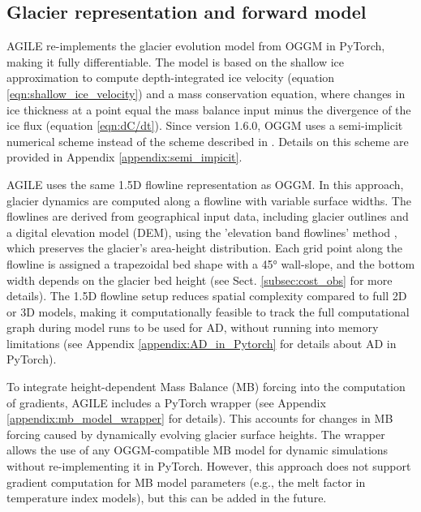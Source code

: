 \documentclass[journal abbreviation, manuscript]{copernicus}
\begin{document}
\subsection{Glacier representation and forward model}
\label{sec:Glacier_representation_and_forward_model}

AGILE re-implements the glacier evolution model from OGGM \citep{Maussion2019} in PyTorch, making it fully differentiable. The model is based on the shallow ice approximation to compute depth-integrated ice velocity (equation \ref{eqn:shallow_ice_velocity}) and a mass conservation equation, where changes in ice thickness at a point equal the mass balance input minus the divergence of the ice flux (equation \ref{eqn:dC/dt}). Since version 1.6.0, OGGM uses a semi-implicit numerical scheme instead of the scheme described in \cite{Maussion2019}. Details on this scheme are provided in Appendix \ref{appendix:semi_impicit}.

AGILE uses the same 1.5D flowline representation as OGGM. In this approach, glacier dynamics are computed along a flowline with variable surface widths. The flowlines are derived from geographical input data, including glacier outlines and a digital elevation model (DEM), using the 'elevation band flowlines' method \citep[e.g.][]{Huss2012, Huss2015, Werder2019}, which preserves the glacier's area-height distribution. Each grid point along the flowline is assigned a trapezoidal bed shape with a 45° wall-slope, and the bottom width depends on the glacier bed height (see Sect. \ref{subsec:cost_obs} for more details). The 1.5D flowline setup reduces spatial complexity compared to full 2D or 3D models, making it computationally feasible to track the full computational graph during model runs to be used for AD, without running into memory limitations (see Appendix \ref{appendix:AD_in_Pytorch} for details about AD in PyTorch).

To integrate height-dependent Mass Balance (MB) forcing into the computation of gradients, AGILE includes a PyTorch wrapper (see Appendix \ref{appendix:mb_model_wrapper} for details). This accounts for changes in MB forcing caused by dynamically evolving glacier surface heights. The wrapper allows the use of any OGGM-compatible MB model for dynamic simulations without re-implementing it in PyTorch. However, this approach does not support gradient computation for MB model parameters (e.g., the melt factor in temperature index models), but this can be added in the future.
\end{document}
